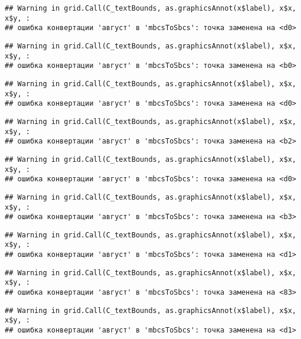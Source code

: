 \documentclass[
]{article}
\begin{document}
\begin{verbatim}
## Warning in grid.Call(C_textBounds, as.graphicsAnnot(x$label), x$x, x$y, :
## ошибка конвертации 'август' в 'mbcsToSbcs': точка заменена на <d0>
\end{verbatim}

\begin{verbatim}
## Warning in grid.Call(C_textBounds, as.graphicsAnnot(x$label), x$x, x$y, :
## ошибка конвертации 'август' в 'mbcsToSbcs': точка заменена на <b0>
\end{verbatim}

\begin{verbatim}
## Warning in grid.Call(C_textBounds, as.graphicsAnnot(x$label), x$x, x$y, :
## ошибка конвертации 'август' в 'mbcsToSbcs': точка заменена на <d0>
\end{verbatim}

\begin{verbatim}
## Warning in grid.Call(C_textBounds, as.graphicsAnnot(x$label), x$x, x$y, :
## ошибка конвертации 'август' в 'mbcsToSbcs': точка заменена на <b2>
\end{verbatim}

\begin{verbatim}
## Warning in grid.Call(C_textBounds, as.graphicsAnnot(x$label), x$x, x$y, :
## ошибка конвертации 'август' в 'mbcsToSbcs': точка заменена на <d0>
\end{verbatim}

\begin{verbatim}
## Warning in grid.Call(C_textBounds, as.graphicsAnnot(x$label), x$x, x$y, :
## ошибка конвертации 'август' в 'mbcsToSbcs': точка заменена на <b3>
\end{verbatim}

\begin{verbatim}
## Warning in grid.Call(C_textBounds, as.graphicsAnnot(x$label), x$x, x$y, :
## ошибка конвертации 'август' в 'mbcsToSbcs': точка заменена на <d1>
\end{verbatim}

\begin{verbatim}
## Warning in grid.Call(C_textBounds, as.graphicsAnnot(x$label), x$x, x$y, :
## ошибка конвертации 'август' в 'mbcsToSbcs': точка заменена на <83>
\end{verbatim}

\begin{verbatim}
## Warning in grid.Call(C_textBounds, as.graphicsAnnot(x$label), x$x, x$y, :
## ошибка конвертации 'август' в 'mbcsToSbcs': точка заменена на <d1>
\end{verbatim}
\end{document}
